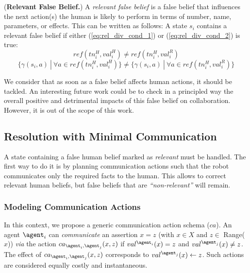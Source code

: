 \begin{definition} \label{def:relevant_false_belief}
(\textbf{Relevant False Belief.}) A \emph{relevant false belief} is a false belief that influences the next action(s) the human is likely to perform in terms of number, name, parameters, or effects. This can be written as follows:
A state $s_i$ contains a relevant false belief if either (\ref{eq:rel_div_cond_1}) or (\ref{eq:rel_div_cond_2}) is true:
\begin{equation} \label{eq:rel_div_cond_1}
ref(tn^H_i, val^H_i) \neq ref(tn^H_i, val^R_i)
\end{equation}
\begin{equation} \label{eq:rel_div_cond_2}
\{ \gamma(s_i,a) ~|~ \forall a \in ref( tn^H_i, val^H_i ) \} \neq \{ \gamma(s_i,a) ~|~ \forall a \in ref( tn^H_i, val^R_i ) \}
\end{equation}
\end{definition}

We consider that as soon as a false belief affects human actions, it should be tackled. An interesting future work could be to check in a principled way the overall positive and detrimental impacts of this false belief on collaboration. However, it is out of the scope of this work.

    \subsection{Resolution with Minimal Communication}

A state containing a false human belief marked as \textit{relevant} must be handled. 
The first way to do it is by planning communication actions such that the robot communicates only the required facts to the human. This allows to correct relevant human beliefs, but false beliefs that are \textit{``non-relevant''} will remain. 

\subsubsection{Modeling Communication Actions} 
In this context, we propose a generic communication action schema ($ca$). 
An agent $\agent_i$ can \textit{communicate} an assertion $x=z$ (with $x \in X$ and $z \in$ Range($x$)) \textit{via} the action $ca_{\agent_i, \agent_j}(x,z)$ if $val^{\agent_i}(x) = z$ and $val^{\agent_j}(x) \neq z$.
The effect of $ca_{\agent_i, \agent_j}(x,z)$ corresponds to $val^{\agent_j}(x) \leftarrow z$. Such actions are considered equally costly and instantaneous.

